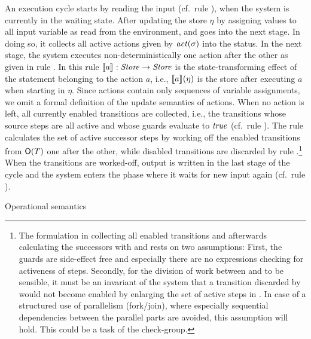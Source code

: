 An execution cycle starts by reading the input (cf.\ rule ), when
the system is currently in the waiting state. After updating the store
$\eta$ by assigning values to all input variable as read from the
environment, and goes into the next stage. In doing so, it collects all
active actions given by $\mathit{act}(\sigma)$ into the status.  In the next stage,
the system executes non-deterministically one action after the other as
given in rule .  In this rule $[\![a]\!]_{} \mathrel{:} \mathit{Store} \to \mathit{Store}$ is
the state-transforming effect of the statement belonging to the action $a$,
i.e., $[\![a]\!]_{}(\eta)$ is the store after executing $a$ when starting in
$\eta$.  Since actions contain only sequences of variable assignments, we
omit a formal definition of the update semantics of actions. When no action
is left, all currently enabled transitions are collected, i.e., the
transitions whose source steps are all active and whose guards evaluate to
$\mathit{true}$ (cf.\ rule ). The rule  calculates the set of
active successor steps by working off the enabled transitions from
$\mathsf{O}(T)$ one after the other, while disabled transitions are
discarded by rule .\footnote{The formulation in 
  collecting all enabled transitions and afterwards calculating the
  successors with  and  rests on two assumptions:
  First, the guards are side-effect free and especially there are no
  expressions checking for activeness of steps. Secondly, for the division
  of work between  and  to be sensible, it must be
  an invariant of the system that a transition discarded by 
  would not become enabled by enlarging the set of active steps in
  . In case of a structured use of parallelism (fork/join), where
  especially sequential dependencies between the parallel parts are
  avoided, this assumption will hold. This could be a task of the
  check-group.} When the transitions are worked-off, output is written in
the last stage of the cycle and the system enters the phase where it waits
for new input again (cf.\ rule ).


\begin{table}[htbp]
  \begin{ruleset}
      
  \end{ruleset}
  \caption{Operational semantics}
  \label{tab:operationalsemantics}
\end{table}







